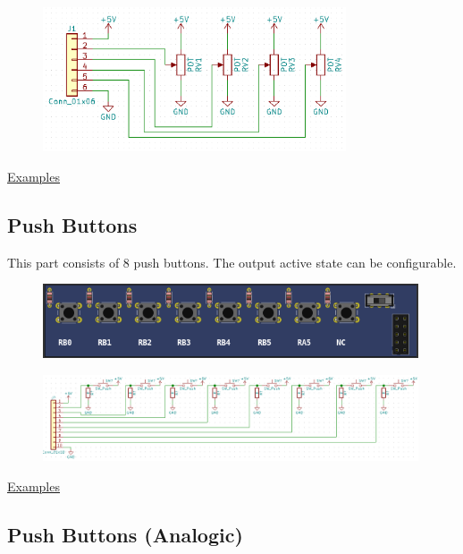 \begin{figure}[H]
\center
\includegraphics[width=0.8\textwidth]{img/part_pot_.png} 
\end{figure} 

\href{https://lcgamboa.github.io/picsimlab_examples/Parts.html\#Potentiometers_(Rotary)}{Examples}

\subsection{Push Buttons}

This part consists of 8 push buttons. The output active state can be configurable.
\begin{figure}[H]
\center
\includegraphics[width=0.99\textwidth]{img/part_buttons.png} 
\end{figure} 

\begin{figure}[H]
\center
\includegraphics[width=0.99\textwidth]{img/part_buttons_.png} 
\end{figure} 

\href{https://lcgamboa.github.io/picsimlab_examples/Parts.html\#Push_Buttons}{Examples}


\subsection{Push Buttons (Analogic)}



